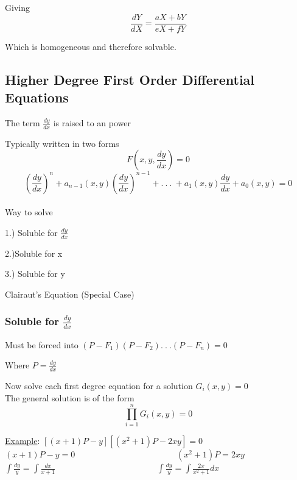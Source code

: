 \documentclass[12pt]{article}
\numberwithin{equation}{subsection}
\newcommand{\deryx}{\frac{dy}{dx}}
\newcommand{\indb}{\hspace{1cm}}
\newcommand{\indd}{\hspace{2cm}}
\newcommand{\exa}{\noindent \underline{Example}: \hspace{1cm}}
\begin{document}
Giving
\begin{equation}
\frac{dY}{dX}= \frac{aX+bY}{eX+fY}
\end{equation}

Which is homogeneous and therefore solvable.

\subsection{Higher Degree First Order Differential Equations}
The term $\deryx$ is raised to an power

Typically written in two forms
\begin{equation}
F(x,y,\deryx)=0
\end{equation}
\begin{equation}
\left( \deryx \right)^{n} + a_{n-1}(x,y)\left( \deryx \right)^{n-1}+ .\ .\ .\ + a_1(x,y)\deryx + a_0(x,y)=0
\end{equation}\\

 Way to solve 

1.) Soluble for $\deryx$

2.)Soluble for x

3.) Soluble for y

\indd Clairaut's Equation (Special Case)

\subsubsection{Soluble for $\deryx$}
Must be forced into $(P-F_1)(P-F_2).\ .\ .(P-F_n)=0$

Where $P=\deryx$

Now solve each first degree equation for a solution $G_i(x,y)=0$\\

The general solution is of the form
\begin{equation}
\prod_{i=1}^{n}G_i(x,y)=0
\end{equation}
\newpage

\exa $[(x+1)P-y][(x^2+1)P-2xy]=0$\\

\indb $(x+1)P-y=0 \hspace{5cm} (x^2+1)P=2xy$\\

\indb $\displaystyle \int \frac{dy}{y} = \int \frac{dx}{x+1} \hspace{5cm} \int \frac{dy}{y} = \int \frac{2x}{x^2+1}dx$ \\
\end{document}
